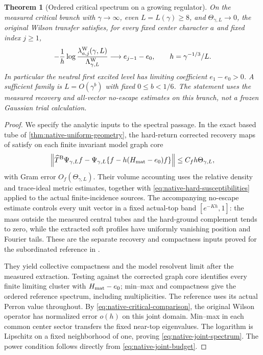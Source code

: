 \documentclass[11pt,oneside,openany]{book}
\newtheorem{theorem}{Theorem}[chapter]
\theoremstyle{definition}
\theoremstyle{remark}
\newcommand{\src}[2]{\cite[#2]{#1}}
\begin{document}
\begin{theorem}[Ordered critical spectrum on a growing regulator]
\label{thm:native-joint-spectrum}
On the measured critical branch with
$\gamma\to\infty$, even $L=L(\gamma)\ge8$, and
$\Theta_{\gamma,L}\to0$, the original Wilson transfer satisfies, for
every fixed center character $a$ and fixed index $j\ge1$,
\begin{equation}
 -\frac1h\log\frac{\lambda^{\rm W}_{a,j}(\gamma,L)}
                         {\Lambda^{\rm W}_{\gamma,L}}
       \longrightarrow e_{j-1}-e_0,
 \qquad h=\gamma^{-1/3}/L.
 \label{eq:native-joint-spectrum}
\end{equation}
In particular the neutral first excited level has limiting coefficient
$e_1-e_0>0$. A sufficient family is
$L=O(\gamma^b)$ with fixed $0\le b<1/6$.
The statement uses the measured recovery and all-vector no-escape
estimates on this branch, not a frozen Gaussian trial calculation.
\end{theorem}
\begin{proof}
We specify the analytic inputs to the spectral passage. In the exact
based tube of \cref{thm:native-uniform-geometry}, the hard-return
corrected recovery maps of \src{F16B}{V54} satisfy on each finite
invariant model graph core
\begin{equation}
 \left\|\widehat T^{\rm B}\Psi_{\gamma,L}f
       -\Psi_{\gamma,L}\{f-h(H_{\rm mat}-e_0)f\}\right\|
       \le C_fh\Theta_{\gamma,L},
 \label{eq:native-joint-recovery}
\end{equation}
with Gram error $O_f(\Theta_{\gamma,L})$. Their volume accounting uses
the relative density and trace-ideal metric estimates, together with
\cref{eq:native-hard-susceptibilities} applied to the actual finite-incidence
sources. The accompanying no-escape estimate controls every unit vector
in a fixed actual-top band $[e^{-Kh},1]$: the mass outside the measured
central tubes and the hard-ground complement tends to zero, while the
extracted soft profiles have uniformly vanishing position and Fourier
tails. These are the separate recovery and compactness inputs proved
for the subordinated reference in \src{F16B}{V54}.

They yield collective compactness and the model resolvent limit after
the measured extraction. Testing against the corrected graph core
identifies every finite limiting cluster with $H_{\rm mat}-e_0$;
min--max and compactness give the ordered reference spectrum, including
multiplicities. The reference uses its actual Perron value throughout.
By \cref{eq:native-critical-comparison}, the original Wilson operator
has normalized error $o(h)$ on this joint domain. Min--max in each
common center sector transfers the fixed near-top eigenvalues.
The logarithm is Lipschitz on a fixed neighborhood of one, proving
\cref{eq:native-joint-spectrum}. The power condition follows directly
from \cref{eq:native-joint-budget}.
\end{proof}
\end{document}
